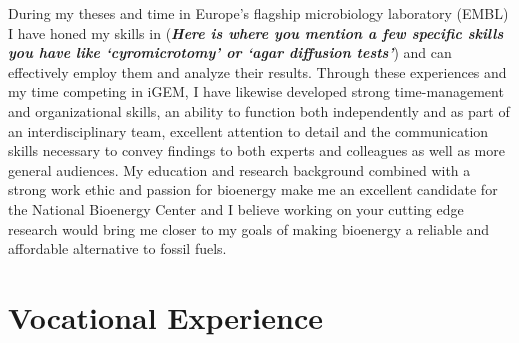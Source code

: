 \documentclass[12pt,a4paper,sans]{moderncv}
\begin{document}
\begin{spacing}{1.2}
{During my theses and time in Europe's flagship microbiology laboratory (EMBL) I have honed my skills in (\emph{\textbf{Here is where you mention a few specific skills you have like `cyromicrotomy' or `agar diffusion tests'}}) and can effectively employ them and analyze their results. %
Through these experiences and my time competing in iGEM, I have likewise developed strong time-management and organizational skills, an ability to function both independently and as part of an interdisciplinary team, excellent attention to detail and the communication skills necessary to convey findings to both experts and colleagues as well as more general audiences. %
My education and research background combined with a strong work ethic and passion for bioenergy make me an excellent candidate for the National Bioenergy Center and I believe working on your cutting edge research would bring me closer to my goals of making bioenergy a reliable and affordable alternative to fossil fuels.
}


\vspace{1mm}
\section{Vocational Experience}


\end{spacing}
\end{document}
